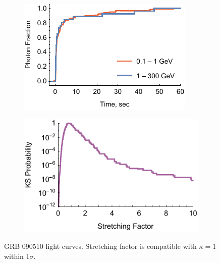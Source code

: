 \documentclass[manuscript]{aastex}
\begin{document}
\begin{figure}
        \centering
        \begin{subfigure}{0.49\textwidth}
                \includegraphics[width=\textwidth]{lightCurve090510}
                \label{fig:lightCurve090510}
        \end{subfigure}
        \begin{subfigure}{0.49\textwidth}
                \includegraphics[width=\textwidth]{probabilities090510}
                \label{fig:probabilities090510}
        \end{subfigure}
        \caption{GRB 090510 light curves. Stretching factor is compatible with $\kappa = 1$ within $1\sigma$.}
        \label{fig:grb090510}
\end{figure}
\end{document}

